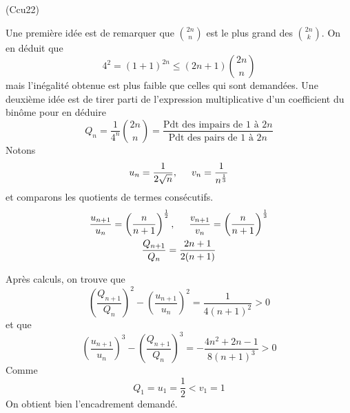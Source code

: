 \begin{tiny}(Ccu22)\end{tiny} Une première idée est de remarquer que $\binom{2n}{n}$ est le plus grand des $\binom{2n}{k}$. On en déduit que
\begin{displaymath}
  4^2 = (1+1)^{2n} \leq (2n+1)\binom{2n}{n}
\end{displaymath}
mais l'inégalité obtenue est plus faible que celles qui sont demandées.\newline
Une deuxième idée est de tirer parti de l'expression multiplicative d'un coefficient du binôme pour en déduire
\begin{displaymath}
  Q_n = \frac{1}{4^n}\binom{2n}{n} = \frac{\text{Pdt des impairs de $1$ à $2n$}}{\text{Pdt des pairs de $1$ à $2n$}}
\end{displaymath}
Notons 
\begin{displaymath}
  u_n = \frac{1}{2\sqrt{n}},\hspace{0.5cm} v_n =\frac{1}{n^{\frac{1}{3}}}
\end{displaymath}
et comparons les quotients de termes consécutifs.
\begin{multline*}
  \frac{u_{n+1}}{u_n} = \left( \frac{n}{n+1}\right)^{\frac{1}{2}} ,\hspace{0.5cm}
  \frac{v_{n+1}}{v_n} = \left( \frac{n}{n+1}\right)^{\frac{1}{3}}\\
  \frac{Q_{n+1}}{Q_n} = \frac{2n+1}{2(n+1)}
\end{multline*}

Après calculs, on trouve que
\begin{displaymath}
 \left( \frac{Q_{n+1}}{Q_n}\right)^{2} - \left(\frac{u_{n+1}}{u_n} \right)^2
 = \frac{1}{4(n+1)^2}>0
\end{displaymath}
et que
\begin{displaymath}
 \left(\frac{u_{n+1}}{u_n} \right)^3 - \left( \frac{Q_{n+1}}{Q_n}\right)^{3}
 = -\frac{4n^2+2n-1}{8(n+1)^3}>0
\end{displaymath}
Comme
\begin{displaymath}
  Q_1 = u_1 = \frac{1}{2} < v_1 = 1
\end{displaymath}
On obtient bien l'encadrement demandé.
